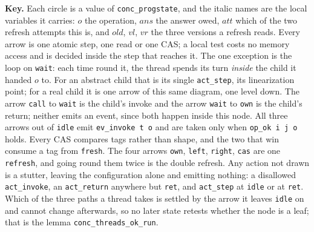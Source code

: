 \documentclass[11pt,a4paper]{article}
\newcommand{\co}[1]{\texttt{#1}}
\begin{document}
\vspace{0.3em}

\begin{center}
\footnotesize
\begin{minipage}{0.94\textwidth}
\textbf{Key.}\;
Each circle is a value of \co{conc\_progstate}, and the italic names are the
local variables it carries: $o$ the operation, $\mathit{ans}$ the answer owed,
$\mathit{att}$ which of the two refresh attempts this is, and $\mathit{old}$,
$\mathit{vl}$, $\mathit{vr}$ the three versions a refresh reads.
Every arrow is one atomic step, one read or one CAS; a local test costs no
memory access and is decided inside the step that reaches it.
The one exception is the loop on \co{wait}: each time round it, the thread
spends its turn \emph{inside} the child it handed $o$ to. For an abstract
child that is its single \co{act\_step}, its linearization point; for a real
child it is one arrow of this same diagram, one level down.
The arrow \co{call} to \co{wait} is the child's invoke and the arrow
\co{wait} to \co{own} is the child's return; neither emits an event, since
both happen inside this node.
All three arrows out of \co{idle} emit \co{ev\_invoke t o} and are taken only
when \co{op\_ok i j o} holds.
Every CAS compares tags rather than shape, and the two that win consume a tag
from \co{fresh}.
The four arrows \co{own}, \co{left}, \co{right}, \co{cas} are one
\co{refresh}, and going round them twice is the double refresh.
Any action not drawn is a stutter, leaving the configuration alone and
emitting nothing: a disallowed \co{act\_invoke}, an \co{act\_return} anywhere
but \co{ret}, and \co{act\_step} at \co{idle} or at \co{ret}.
Which of the three paths a thread takes is settled by the arrow it leaves
\co{idle} on and cannot change afterwards, so no later state retests whether
the node is a leaf; that is the lemma \co{conc\_threads\_ok\_run}.
\end{minipage}
\end{center}
\end{document}
